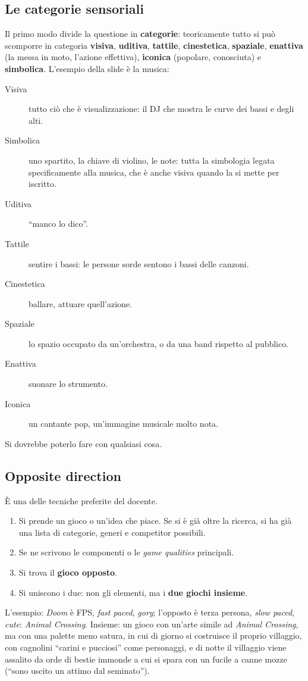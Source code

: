 \subsection{Le categorie sensoriali}

Il primo modo divide la questione in \textbf{categorie}: teoricamente tutto si
può scomporre in categoria \textbf{visiva}, \textbf{uditiva}, \textbf{tattile},
\textbf{cinestetica}, \textbf{spaziale}, \textbf{enattiva} (la messa in moto,
l'azione effettiva), \textbf{iconica} (popolare, conosciuta) e
\textbf{simbolica}. L'esempio della slide è la musica:
\begin{description}
  \item[Visiva] tutto ciò che è visualizzazione: il DJ che mostra le curve dei
        bassi e degli alti.
  \item[Simbolica] uno spartito, la chiave di violino, le note: tutta la
        simbologia legata specificamente alla musica, che è anche visiva
        quando la si mette per iscritto.
  \item[Uditiva] ``manco lo dico''.
  \item[Tattile] sentire i bassi: le persone sorde sentono i bassi delle
        canzoni.
  \item[Cinestetica] ballare, attuare quell'azione.
  \item[Spaziale] lo spazio occupato da un'orchestra, o da una band rispetto al
        pubblico.
  \item[Enattiva] suonare lo strumento.
  \item[Iconica] un cantante pop, un'immagine musicale molto nota.
\end{description}
Si dovrebbe poterlo fare con qualsiasi cosa.

\subsection{Opposite direction}

È una delle tecniche preferite del docente.
\begin{enumerate}
  \item Si prende un gioco o un'idea che piace. Se si è già oltre la ricerca,
        si ha già una lista di categorie, generi e competitor possibili.
  \item Se ne scrivono le componenti o le \emph{game qualities} principali.
  \item Si trova il \textbf{gioco opposto}.
  \item Si uniscono i due: non gli elementi, ma i \textbf{due giochi
        insieme}.
\end{enumerate}
L'esempio: \emph{Doom} è FPS, \emph{fast paced}, \emph{gory}; l'opposto è
terza persona, \emph{slow paced}, \emph{cute}: \emph{Animal Crossing}. Insieme:
un gioco con un'arte simile ad \emph{Animal Crossing}, ma con una palette meno
satura, in cui di giorno si costruisce il proprio villaggio, con cagnolini
``carini e pucciosi'' come personaggi, e di notte il villaggio viene assalito
da orde di bestie immonde a cui si spara con un fucile a canne mozze (``sono
uscito un attimo dal seminato'').

